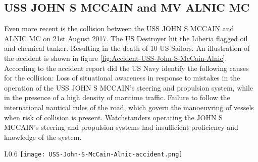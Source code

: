 \subsection{USS JOHN S MCCAIN and MV ALNIC MC}
Even more recent is the collision between the USS JOHN S MCCAIN and ALNIC MC on 21st August 2017. The US Destroyer hit the Liberia flagged oil and chemical tanker. Resulting in the death of 10  US Sailors. An illustration of the accident is shown in figure \ref{fig:Accident-USS-John-S-McCain-Alnic}. According to the accident report did the US Navy identify the following causes for the collision: Loss of situational awareness in response to mistakes in the operation of the USS JOHN S MCCAIN's steering and propulsion system, while in the presence of a high density of maritime traffic. Failure to follow the international nautical rules of the road, which govern the manoeuvring of vessels when risk of collision is present. Watchstanders operating the JOHN S MCCAIN's steering and propulsion systems had insufficient proficiency and knowledge of the system. 

\begin{wrapfigure}{L}{0.6\textwidth}
	\centering
	\texttt{[image: USS-John-S-McCain-Alnic-accident.png]}
	\caption{Illutstration map of approximate collision location}
	\label{fig:Accident-USS-John-S-McCain-Alnic}
\end{wrapfigure}

